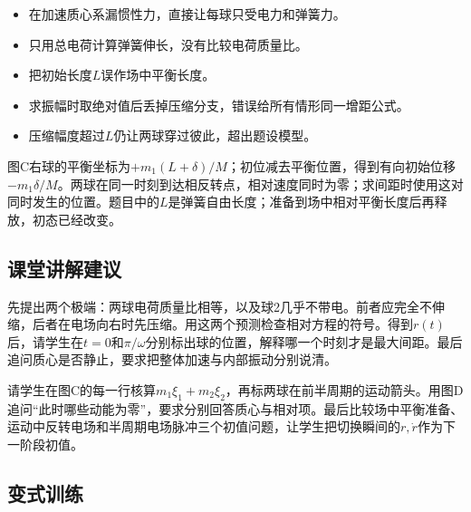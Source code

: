 \documentclass[UTF8,fontset=fandol,a4paper,11pt]{ctexart}
\begin{document}
\begin{itemize}
\item 在加速质心系漏惯性力，直接让每球只受电力和弹簧力。
\item 只用总电荷计算弹簧伸长，没有比较电荷质量比。
\item 把初始长度$L$误作场中平衡长度。
\item 求振幅时取绝对值后丢掉压缩分支，错误给所有情形同一增距公式。
\item 压缩幅度超过$L$仍让两球穿过彼此，超出题设模型。
\end{itemize}

图C右球的平衡坐标为$+m_1(L+\delta)/M$；初位减去平衡位置，得到有向初始位移$-m_1\delta/M$。两球在同一时刻到达相反转点，相对速度同时为零；求间距时使用这对同时发生的位置。题目中的$L$是弹簧自由长度；准备到场中相对平衡长度后再释放，初态已经改变。



\subsection*{课堂讲解建议}

先提出两个极端：两球电荷质量比相等，以及球2几乎不带电。前者应完全不伸缩，后者在电场向右时先压缩。用这两个预测检查相对方程的符号。得到$r(t)$后，请学生在$t=0$和$\pi/\omega$分别标出球的位置，解释哪一个时刻才是最大间距。最后追问质心是否静止，要求把整体加速与内部振动分别说清。

请学生在图C的每一行核算$m_1\xi_1+m_2\xi_2$，再标两球在前半周期的运动箭头。用图D追问“此时哪些动能为零”，要求分别回答质心与相对项。最后比较场中平衡准备、运动中反转电场和半周期电场脉冲三个初值问题，让学生把切换瞬间的$r,\dot r$作为下一阶段初值。



\subsection*{变式训练}
\end{document}
